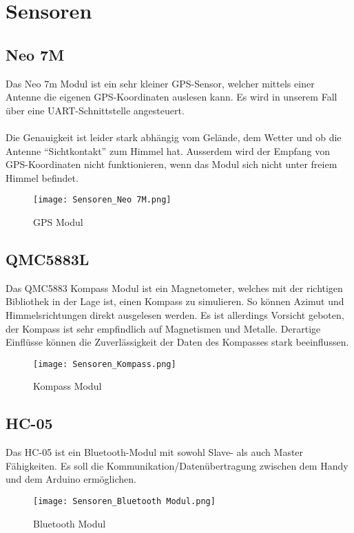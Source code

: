 \section{Sensoren}

\subsection{Neo 7M}
Das Neo 7m Modul ist ein sehr kleiner GPS-Sensor, welcher mittels einer Antenne die eigenen GPS-Koordinaten auslesen kann. Es wird in unserem Fall über eine UART-Schnittstelle angesteuert. \\
\\
Die Genauigkeit ist leider stark abhängig vom Gelände, dem Wetter und ob die Antenne “Sichtkontakt” zum Himmel hat. Ausserdem wird der Empfang von GPS-Koordinaten nicht funktionieren, wenn das Modul sich nicht unter freiem Himmel befindet.

\begin{figure}[H]
    \begin{center}
    \texttt{[image: Sensoren\_Neo 7M.png]}
    \end{center}
    \caption{GPS Modul}
\end{figure}

\subsection{QMC5883L}
Das QMC5883 Kompass Modul ist ein Magnetometer, welches mit der richtigen Bibliothek in der Lage ist, einen Kompass zu simulieren. So können Azimut und Himmelsrichtungen direkt ausgelesen werden. Es ist allerdings Vorsicht geboten, der Kompass ist sehr empfindlich auf Magnetismen und Metalle. Derartige Einflüsse können die Zuverlässigkeit der Daten des Kompasses stark beeinflussen.

\begin{figure}[H]
    \begin{center}
    \texttt{[image: Sensoren\_Kompass.png]}
    \end{center}
    \caption{Kompass Modul}
\end{figure}

\pagebreak

\subsection{HC-05}
Das HC-05 ist ein Bluetooth-Modul mit sowohl Slave- als auch Master Fähigkeiten. Es soll die Kommunikation/Datenübertragung zwischen dem Handy und dem Arduino ermöglichen. 

\begin{figure}[H]
    \begin{center}
    \texttt{[image: Sensoren\_Bluetooth Modul.png]}
    \end{center}
    \caption{Bluetooth Modul}
\end{figure}

